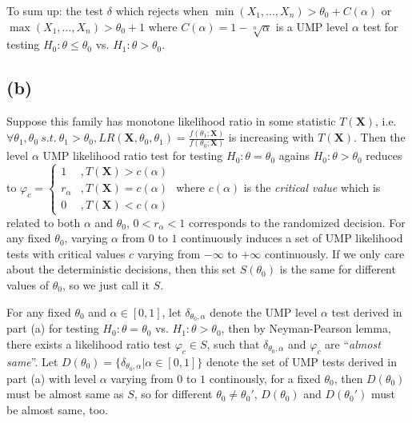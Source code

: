 To sum up: the test $\delta$ which rejects when
$
\min(X_1, \dots, X_n) > \theta_0 + C(\alpha)
$
or
$
\max(X_1, \dots, X_n) > \theta_0 + 1
$
where
$
C(\alpha) = 1-\sqrt[n]{\alpha}
$
is a UMP level $\alpha$ test for testing $H_0: \theta \leq \theta_0$ vs. $H_1: \theta > \theta_0$.

\subsection*{(b)}
Suppose this family has monotone likelihood ratio in some statistic $T(\mathbf{X})$, i.e. \\
$
\forall \theta_1, \theta_0 ~ s.t. ~ \theta_1>\theta_0,
LR(\mathbf{X}, \theta_0, \theta_1) =
\frac{f(\theta_1; \mathbf{X})}{f(\theta_0; \mathbf{X})}
$
is increasing with $T(\mathbf{X})$.
Then the level $\alpha$ UMP likelihood ratio test for testing
$
H_0: \theta = \theta_0
$
agains
$
H_0: \theta > \theta_0
$
reduces to
$
\varphi_{c} = \left\{\begin{array}{cl}
1 & ,T(\mathbf{X}) > c(\alpha) \\
r_{\alpha} & ,T(\mathbf{X}) = c(\alpha) \\
0 & ,T(\mathbf{X}) < c(\alpha)
\end{array}\right.
$
where
$
c(\alpha)
$
is the \emph{critical value} which is related to both $\alpha$ and $\theta_0$,
$
0<r_{\alpha}<1
$ corresponds to the randomized decision.
For any fixed $\theta_0$, varying $\alpha$ from $0$ to $1$ continuously induces a set of UMP likelihood tests with critical values $c$ varying from $-\infty$ to $+\infty$ continuously. If we only care about the deterministic decisions, then this set
$S(\theta_0)$ is the same for different values of $\theta_0$, so we just call it $S$.

For any fixed $\theta_0$ and $\alpha \in [0, 1]$, let $\delta_{\theta_0, \alpha}$ denote the UMP level $\alpha$ test derived in part (a) for testing $H_0: \theta=\theta_0$ vs. $H_1: \theta>\theta_0$,
then by Neyman-Pearson lemma, there exists a likelihood ratio test $\varphi_{c} \in S$, such that
$\delta_{\theta_0, \alpha}$ and $\varphi_{c}$ are ``\emph{almost same}''.
Let
$
D(\theta_0) = \{ \delta_{\theta_0, \alpha} | \alpha \in [0, 1] \}
$
denote the set of UMP tests derived in part (a) with level $\alpha$ varying from $0$ to $1$ continously, for a fixed $\theta_0$, then $D(\theta_0)$ must be almost same as $S$, so for different $\theta_0 \neq \theta_0'$, $D(\theta_0)$ and $D(\theta_0')$ must be almost same, too.

